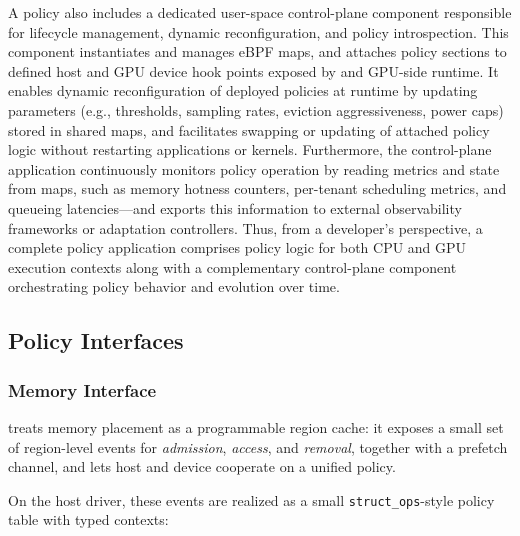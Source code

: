 A \sys policy also includes a dedicated user-space control-plane component responsible for lifecycle management, dynamic reconfiguration, and policy introspection. This component instantiates and manages eBPF maps, and attaches policy sections to defined host and GPU device hook points exposed by \sysdriver and GPU-side runtime. It enables dynamic reconfiguration of deployed policies at runtime by updating parameters (e.g., thresholds, sampling rates, eviction aggressiveness, power caps) stored in shared maps, and facilitates swapping or updating of attached policy logic without restarting applications or kernels. Furthermore, the control-plane application continuously monitors policy operation by reading metrics and state from maps, such as memory hotness counters, per-tenant scheduling metrics, and queueing latencies—and exports this information to external observability frameworks or adaptation controllers. Thus, from a developer's perspective, a complete \sys policy application comprises policy logic for both CPU and GPU execution contexts along with a complementary control-plane component orchestrating policy behavior and evolution over time.

\subsection{Policy Interfaces}
\label{sec:design-interfaces}

\subsubsection{Memory Interface}
\label{sec:design-mem}

\sys treats memory placement as a programmable region
cache: it exposes a small set of region-level events for \emph{admission},
\emph{access}, and \emph{removal}, together with a prefetch channel, and lets host
and device cooperate on a unified policy.

On the host driver, these events are realized as a small \texttt{struct\_ops}-style policy
table with typed contexts:

